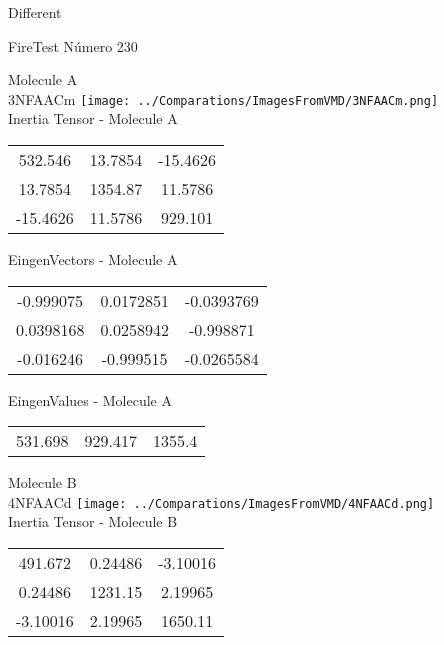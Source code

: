 \begin{center}
\vtab
\vtab
\textcolor{NavyBlue}{\Large Different}
\end{center}

 \newpage

\vtab[-2cm]
\begin{center}
{\large FireTest \tab Número 230}
\end{center}
\begin{multicols}{2}
\begin{center}

Molecule A \\ 
3NFAACm
\texttt{[image: ../Comparations/ImagesFromVMD/3NFAACm.png]}
\\
Inertia Tensor - Molecule A \\
\vtab

\begin{tabular}{|c c c|}
532.546	 & 	13.7854	 & 	-15.4626	 \\
13.7854	 & 	1354.87	 & 	11.5786	 \\
-15.4626	 & 	11.5786	 & 	929.101
\end{tabular}

\vtab
 EingenVectors - Molecule A     \\
\vtab
\begin{tabular}{|c c c|}
-0.999075	 & 	0.0172851	 & 	-0.0393769	 \\
0.0398168	 & 	0.0258942	 & 	-0.998871	 \\
-0.016246	 & 	-0.999515	 & 	-0.0265584
\end{tabular}

\vtab
 EingenValues - Molecule A     \\
\vtab
\begin{tabular}{|c c c|}
531.698	 & 	929.417	 & 	1355.4	 \\
\end{tabular}
\columnbreak

Molecule B \\ 
4NFAACd
\texttt{[image: ../Comparations/ImagesFromVMD/4NFAACd.png]}
\\
Inertia Tensor - Molecule B \\
\vtab

\begin{tabular}{|c c c|}
491.672	 & 	0.24486	 & 	-3.10016	 \\
0.24486	 & 	1231.15	 & 	2.19965	 \\
-3.10016	 & 	2.19965	 & 	1650.11
\end{tabular}


\end{center}
\end{multicols}
